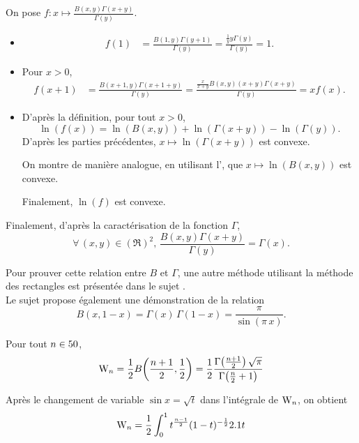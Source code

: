 \begin{demo}
On pose $f : x \mapsto \frac{B(x, y) \Gamma(x + y)}{\Gamma(y)}$.
\begin{itemize}
\item
\begin{align*}
f(1)
&= \frac{B(1, y) \Gamma(y + 1)}{\Gamma(y)}
= \frac{\frac{1}{y} y \Gamma(y)}{\Gamma(y)}
= 1.
\end{align*}

\item Pour $x > 0$,
\begin{align*}
f(x + 1)
&= \frac{B(x + 1, y) \Gamma(x + 1 + y)}{\Gamma(y)}
= \frac{\frac{x}{x + y} B(x, y) (x + y) \Gamma(x + y)}{\Gamma(y)}
= x f(x).
\end{align*}

\item D'après la définition, pour tout $x > 0$,
\[
\ln(f(x)) = \ln(B(x, y)) + \ln(\Gamma(x + y)) - \ln(\Gamma(y)).
\]
D'après les parties précédentes, $x \mapsto \ln(\Gamma(x + y))$ est convexe.

On montre de manière analogue, en utilisant l', que $x \mapsto \ln(B(x, y))$ est convexe.

Finalement, $\ln(f)$ est convexe.
\end{itemize}
Finalement, d'après la caractérisation de la fonction $\Gamma$,
\[
\forall\, (x, y) \in (\Re)^2,\,
\frac{B(x, y) \Gamma(x + y)}{\Gamma(y)} = \Gamma(x).
\]
\end{demo}

\begin{remarque}
Pour prouver cette relation entre $B$ et $\Gamma$, une autre méthode utilisant la méthode des rectangles est présentée dans le sujet \cite{cs_1_2009}. \\
Le sujet propose également une démonstration de la relation 
\[
B(x, 1 - x) = \Gamma(x) \, \Gamma(1 - x) = \frac{\pi}{\sin(\pi \, x)}.
\]
\end{remarque}


\begin{theo}
Pour tout $n \in 50$,
\[
\mathrm{W}_n = \frac{1}{2} B\mathopen{}\left(\frac{n+1}{2}, \frac{1}{2} \right) = \frac{1}{2} \frac{\Gamma\mathopen{}\left(\frac{n+1}{2}\right) \sqrt{\pi}}{\Gamma\mathopen{}\left(\frac{n}{2}+1\right)}
\]
\end{theo}

\begin{elemdemo}
Après le changement de variable $\sin x = \sqrt{t}$ dans l'intégrale de  $\mathrm{W}_n$, on obtient
\[
\mathrm{W}_n = \frac{1}{2} \int_0^1 t^{\frac{n-1}{2}} (1-t)^{-\frac{1}{2}} 2.1 t
\]
\end{elemdemo}
